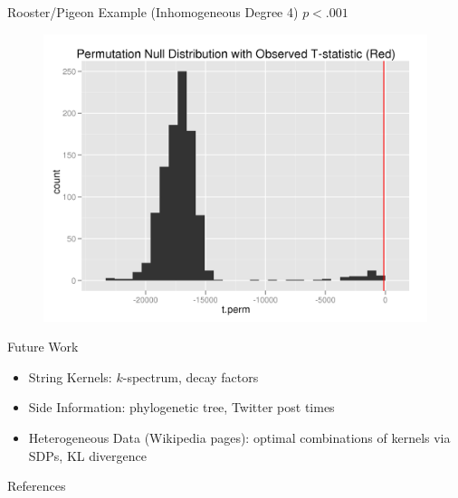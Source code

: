 \documentclass{beamer}
\begin{document}
\begin{frame}{Rooster/Pigeon Example (Inhomogeneous Degree 4)}
  $p < .001$
  \begin{figure}
    \centering
    \includegraphics[scale=.6]{rooster-pigeon-twosamp-4-1.png}
  \end{figure}
\end{frame}

\begin{frame}{Future Work}
  \begin{itemize}
  \item String Kernels: \pause $k$-spectrum, decay factors
  \item Side Information: \pause phylogenetic tree, Twitter post times
  \item Heterogeneous Data (Wikipedia pages): \pause optimal combinations of kernels
    via SDPs, KL divergence 
  \end{itemize}
\end{frame}

\begin{frame}[allowframebreaks]{References}
  
  
\end{frame}
\end{document}
